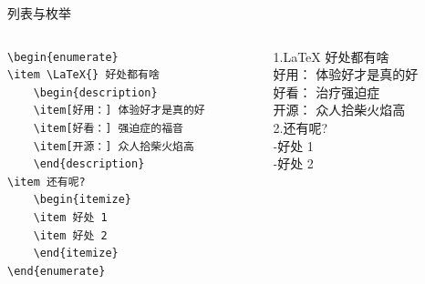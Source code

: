 \begin{frame}[fragile]{列表与枚举}
    \begin{columns}
        \begin{column}{.6\textwidth}
            \begin{lstlisting}[basicstyle=\ttfamily\small]
\begin{enumerate}
\item \LaTeX{} 好处都有啥
    \begin{description}
    \item[好用：] 体验好才是真的好
    \item[好看：] 强迫症的福音
    \item[开源：] 众人拾柴火焰高
    \end{description}
\item 还有呢?
    \begin{itemize}
    \item 好处 1
    \item 好处 2
    \end{itemize}
\end{enumerate}\end{lstlisting}
        \end{column}
        \begin{column}{.4\textwidth}
            {\small
                1.\quad \LaTeX{} 好处都有啥\\
                \quad 好用： 体验好才是真的好\\
                \quad 好看： 治疗强迫症\\
                \quad 开源： 众人拾柴火焰高\\
                2.\quad 还有呢?\\
                \quad -\quad 好处 1\\
                \quad -\quad 好处 2
            }
        \end{column}
    \end{columns}

\end{frame}



